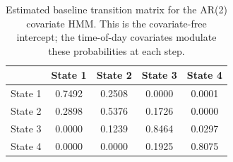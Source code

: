 \begin{table}[ht]
\centering
\begin{tabular}{lcccc}
\hline
 & State 1 & State 2 & State 3 & State 4 \\
\hline
State 1 & 0.7492 & 0.2508 & 0.0000 & 0.0001 \\
State 2 & 0.2898 & 0.5376 & 0.1726 & 0.0000 \\
State 3 & 0.0000 & 0.1239 & 0.8464 & 0.0297 \\
State 4 & 0.0000 & 0.0000 & 0.1925 & 0.8075 \\
\hline
\end{tabular}
\caption{Estimated baseline transition matrix for the AR(2) covariate HMM. This is the covariate-free intercept; the time-of-day covariates modulate these probabilities at each step.}
\label{tab:ar_2_covariate_hmm_transition}
\end{table}
